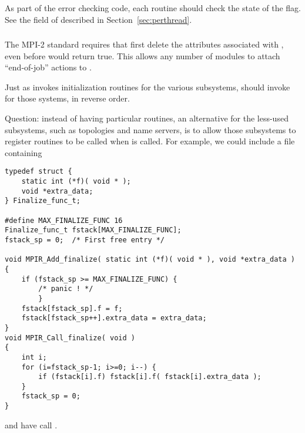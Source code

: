 \documentclass{article}
\begin{document}
\subsubsection{}
As part of the error checking code, each routine should check the
state of the  flag.  
See the  field of 
described in Section~\ref{sec:perthread}. 

\subsubsection{}
\label{sec:finalize}
The MPI-2 standard requires that  first delete the
attributes associated with , even before
 would return true.  This allows any number of
modules to attach ``end-of-job'' actions to .

Just as  invokes initialization routines for
the various subsystems,  should invoke
 for those systems, in reverse order.

Question: instead of having particular 
routines, an alternative for the less-used subsystems, such as
topologies and name servers, is to allow those subsystems to register
routines to be called when  is called.  For
example, we could include a file containing
\begin{verbatim}
typedef struct {
    static int (*f)( void * );
    void *extra_data;
} Finalize_func_t;

#define MAX_FINALIZE_FUNC 16
Finalize_func_t fstack[MAX_FINALIZE_FUNC];
fstack_sp = 0;  /* First free entry */

void MPIR_Add_finalize( static int (*f)( void * ), void *extra_data )
{
    if (fstack_sp >= MAX_FINALIZE_FUNC) {
        /* panic ! */
        }
    fstack[fstack_sp].f = f;
    fstack[fstack_sp++].extra_data = extra_data;
}
void MPIR_Call_finalize( void )
{
    int i;
    for (i=fstack_sp-1; i>=0; i--) {
        if (fstack[i].f) fstack[i].f( fstack[i].extra_data );
    }
    fstack_sp = 0;
}
\end{verbatim}
and have  call .
\end{document}
